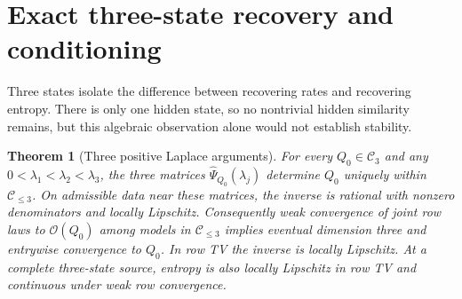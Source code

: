 \documentclass[aps,pre,onecolumn,11pt,longbibliography,notitlepage]{revtex4-2}
\newtheorem{theorem}{Theorem}
\newcommand{\1}{\mathbf 1}
\newcommand{\C}{\mathcal C}
\newcommand{\Obs}{\mathcal O}
\begin{document}
\section{Exact three-state recovery and conditioning}\label{sec:three}
Three states isolate the difference between recovering rates and recovering entropy. There is only one hidden state, so no nontrivial hidden similarity remains, but this algebraic observation alone would not establish stability.

\begin{theorem}[Three positive Laplace arguments]\label{thm:inverse}
For every $Q_0\in\C_3$ and any $0<\lambda_1<\lambda_2<\lambda_3$, the three matrices $\widehat\Psi_{Q_0}(\lambda_j)$ determine $Q_0$ uniquely within $\C_{\le3}$. On admissible data near these matrices, the inverse is rational with nonzero denominators and locally Lipschitz. Consequently weak convergence of joint row laws to $\Obs(Q_0)$ among models in $\C_{\le3}$ implies eventual dimension three and entrywise convergence to $Q_0$. In row TV the inverse is locally Lipschitz. At a complete three-state source, entropy is also locally Lipschitz in row TV and continuous under weak row convergence.
\end{theorem}
\end{document}
